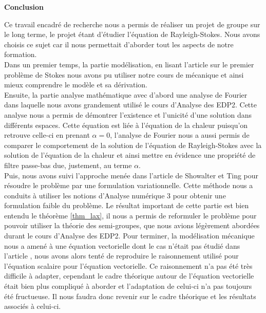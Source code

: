 
\thispagestyle{empty}
\vspace*{1cm}

\begin{center}
    \Large\textbf{Conclusion}
\end{center}

Ce travail encadré de recherche nous a permis de réaliser un projet de groupe sur le long terme, le projet étant d'étudier l'équation de Rayleigh-Stokes. Nous avons choisis ce sujet car il nous permettait d'aborder tout les aspects de notre formation. 
\\
Dans un premier temps, la partie modélisation, en lisant l'article sur le premier problème de Stokes \cite{Christov2010} nous avons pu utiliser notre cours de mécanique et ainsi mieux comprendre le modèle et sa dérivation. 
\\
Ensuite, la partie analyse mathématique avec d'abord une analyse de Fourier dans laquelle nous avons grandement utilisé le cours d'Analyse des EDP2. Cette analyse nous a permis de démontrer l'existence et l'unicité d'une solution dans différents espaces. Cette équation est liée à l'équation de la chaleur puisqu'on retrouve celle-ci en prenant $\alpha=0$, l'analyse de Fourier nous a aussi permis de comparer le comportement de la solution de l'équation de Rayleigh-Stokes avec la solution de l'équation de la chaleur et ainsi mettre en évidence une propriété de filtre passe-bas due, justement, au terme $\alpha$.
\\
Puis, nous avons suivi l'approche menée dans l'article de Showalter et Ting \cite{Showalter_Ting} pour résoudre le problème par une formulation variationnelle. Cette méthode nous a conduits à utiliser les notions d'Analyse numérique $3$ pour obtenir une formulation faible du problème. Le résultat important de cette partie est bien entendu le théorème \ref{thm_lax}, il nous a permis de reformuler le problème pour pouvoir utiliser la théorie des semi-groupes, que nous avions légèrement abordées durant le cours d'Analyse des EDP2. Pour terminer, la modélisation mécanique nous a amené à une équation vectorielle dont le cas n'était pas étudié dans l'article \cite{Showalter_Ting}, nous avons alors tenté de reproduire le raisonnement utilisé pour l'équation scalaire pour l'équation vectorielle. Ce raisonnement n'a pas été très difficile à adapter, cependant le cadre théorique autour de l'équation vectorielle était bien plus compliqué à aborder et l'adaptation de celui-ci n'a pas toujours été fructueuse. Il nous faudra donc revenir sur le cadre théorique et les résultats associés à celui-ci.
